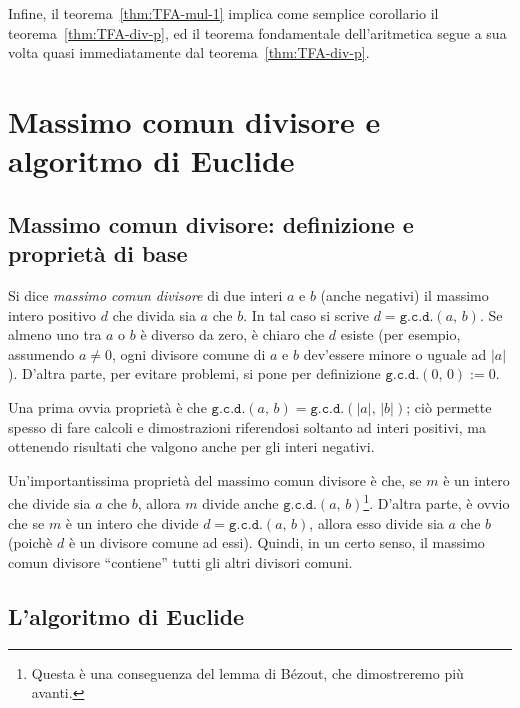 \documentclass[pdflatex,11pt,a4paper,oneside]{article}
\newcommand{\TFA}{teorema fondamentale dell'aritmetica}
\newcommand{\abs}[1]{\left|{#1}\right|}
\newcommand{\gcdop}[0]{\ensuremath{\mathtt{g.c.d.}}}
\newcommand{\xgcd}[1]{\ensuremath{\gcdop\left({#1}\right)}}
\renewcommand{\gcd}[2]{\xgcd{{#1},\,{#2}}}
\begin{document}
Infine, il teorema~\eqref{thm:TFA-mul-1} implica come semplice corollario
il teorema~\eqref{thm:TFA-div-p}, ed il \TFA{} segue a sua volta quasi
immediatamente dal teorema~\eqref{thm:TFA-div-p}.


\section{Massimo comun divisore e algoritmo di Euclide}


\subsection{Massimo comun divisore: definizione e propriet\`a di base}

Si dice \emph{massimo comun divisore} di due interi $a$ e $b$ (anche
negativi) il massimo intero positivo $d$ che divida sia $a$ che $b$.
In tal caso si scrive $d = \gcd{a}{b}$.  Se almeno uno tra $a$ o $b$
\`e diverso da zero, \`e chiaro che $d$ esiste (per esempio, assumendo
$a \neq 0$, ogni divisore comune di $a$ e $b$ dev'essere minore o
uguale ad $\abs{a}$).  D'altra parte, per evitare problemi, si pone
per definizione $\gcd{0}{0} := 0$.

Una prima ovvia propriet\`a \`e che $\gcd{a}{b} = \gcd{\abs{a}}{\abs{b}}$;
ci\`o permette spesso di fare calcoli e dimostrazioni riferendosi soltanto
ad interi positivi, ma ottenendo risultati che valgono anche per gli
interi negativi.

Un'importantissima propriet\`a del massimo comun divisore \`e che, se
$m$ \`e un intero che divide sia $a$ che $b$, allora $m$ divide anche
$\gcd{a}{b}$\footnote{Questa \`e una conseguenza del lemma di B\'ezout,
che dimostreremo pi\`u avanti.}. D'altra parte, \`e ovvio che se $m$ \`e
un intero che divide $d = \gcd{a}{b}$, allora esso divide sia $a$ che $b$
(poich\`e $d$ \`e un divisore comune ad essi).  Quindi, in un certo senso,
il massimo comun divisore ``contiene'' tutti gli altri divisori comuni.


\subsection{L'algoritmo di Euclide}
\end{document}
